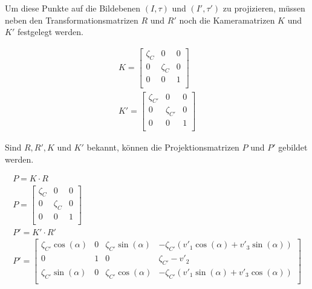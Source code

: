 
 Um diese Punkte auf die Bildebenen $(I,\tau)$ und $(I',\tau')$ zu projizieren, müssen neben den Transformationsmatrizen $R$ und $R'$ noch die Kameramatrizen $K$ und $K'$ festgelegt werden.


\begin{gather}		
K =
\begin{bmatrix}
\zeta_{C}&0&0\\
0&\zeta_{C}&0\\
0&0&1\\
\end{bmatrix}\\
K' =
\begin{bmatrix}
\zeta_{C'}&0&0\\
0&\zeta_{C'}&0\\
0&0&1\\
\end{bmatrix}
\end{gather}

Sind $R,R',K$ und $K'$ bekannt, können die Projektionsmatrizen $P$ und $P'$ gebildet werden. 


\begin{gather}
P = K\cdot R \\
P =
\begin{bmatrix}
\zeta_{C}&0&0\\
0&\zeta_{C}&0\\
0&0&1\\
\end{bmatrix}\\
P' = K' \cdot R'\\
P' =
\begin{bmatrix}
\zeta_{C'} \cos(\alpha)&0&\zeta_{C'} \sin(\alpha)&-\zeta_{C'} (v'_1\cos(\alpha)+v'_3\sin(\alpha) )\\
0&1&0&\zeta_{C'}-v'_2\\
\zeta_{C'}\sin(\alpha)&0&\zeta_{C'}\cos(\alpha)&-\zeta_{C'}(v'_1\sin(\alpha)+v'_3\cos(\alpha))\\
\end{bmatrix}
\end{gather}



